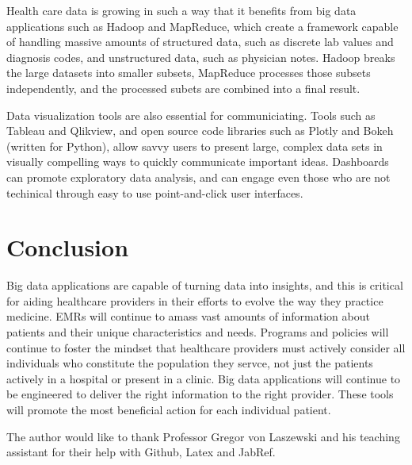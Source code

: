 \documentclass[sigconf]{acmart}
\begin{document}
 Health care data is growing in such a way that it benefits from  big data applications such as Hadoop and MapReduce, which create a framework capable of handling massive amounts of structured data, such as discrete lab values and diagnosis codes, and unstructured data, such as physician notes. Hadoop breaks the large datasets into smaller subsets, MapReduce processes those subsets independently, and the processed subets are combined into a final result\cite{editor13}.

 Data visualization tools are also essential for communiciating. Tools such as Tableau and Qlikview, and open source code libraries such as Plotly and Bokeh (written for Python), allow savvy users to present large, complex data sets in visually compelling ways to quickly communicate important ideas. Dashboards can promote exploratory data analysis, and can engage even those who are not techinical through easy to use point-and-click user interfaces.
 
\section{Conclusion}

 Big data applications are capable of turning data into insights, and this is critical for aiding healthcare providers in their efforts to evolve the way they practice medicine. EMRs will continue to amass vast amounts of information about patients and their unique characteristics and needs. Programs and policies will continue to foster the mindset that healthcare providers must actively consider all individuals who constitute the population they servce, not just the patients actively in a hospital or present in a clinic. Big data applications will continue to be engineered to deliver the right information to the right provider. These tools will promote the most beneficial action for each individual patient.   

\begin{acks}

  The author would like to thank Professor Gregor von Laszewski and his teaching assistant for their help with Github, Latex and JabRef. 

\end{acks}


 
\end{document}
